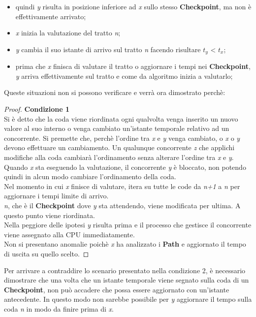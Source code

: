 \begin{itemize}
\begin{itemize}
\item quindi \emph{y} risulta in posizione inferiore ad \emph{x} sullo stesso \textbf{Checkpoint}, ma non è effettivamente arrivato;
\item \emph{x} inizia la valutazione del tratto \emph{n};
\item \emph{y} cambia il suo istante di arrivo sul tratto \emph{n} facendo risultare $t_y$ < $t_x$;
\item prima che \emph{x} finisca di valutare il tratto o aggiornare i tempi nei \textbf{Checkpoint}, \emph{y} arriva effettivamente sul 
tratto e come da algoritmo inizia a valutarlo;
\end{itemize}
Queste situazioni non si possono verificare e verrà ora dimostrato perchè:
\begin{proof} \textbf{Condizione 1}\\
Si è detto che la coda viene riordinata ogni qualvolta venga inserito un nuovo valore al suo interno o venga cambiato un'istante temporale
relativo ad un concorrente. Si premette che, perchè l'ordine tra \emph{x} e \emph{y} venga cambiato, o \emph{x} o \emph{y} devono effettuare
un cambiamento. Un qualunque concorrente \emph{z} che applichi modifiche alla coda cambiarà l'ordinamento senza alterare l'ordine tra \emph{x}
e \emph{y}.\\
Quando \emph{x} sta eseguendo la valutazione, il concorrente \emph{y} è bloccato, non potendo quindi in alcun modo cambiare l'ordinamento della 
coda.\\ 
Nel momento in cui \emph{x} finisce di valutare, itera su tutte le code da \emph{n+1} a \emph{n} per aggiornare i tempi limite di arrivo.\\
\emph{n}, che è il \textbf{Checkpoint} dove \emph{y} sta attendendo, viene modificata per ultima. A questo punto viene riordinata.\\
Nella peggiore delle ipotesi \emph{y} risulta prima e il processo che gestisce il concorrente viene assegnato alla CPU immediatamente.\\
Non si presentano anomalie poichè \emph{x} ha analizzato i \textbf{Path} e aggiornato il tempo di uscita su quello scelto. %
\end{proof}
Per arrivare a contraddire lo scenario presentato nella condizione 2, è necessario dimostrare che una volta che un istante temporale
viene segnato sulla coda di un \textbf{Checkpoint}, non può accadere che possa essere aggiornato con un'istante antecedente. In questo modo
non sarebbe possibile per \emph{y} aggiornare il tempo sulla coda \emph{n} in modo da finire prima di \emph{x}.

\end{itemize}
